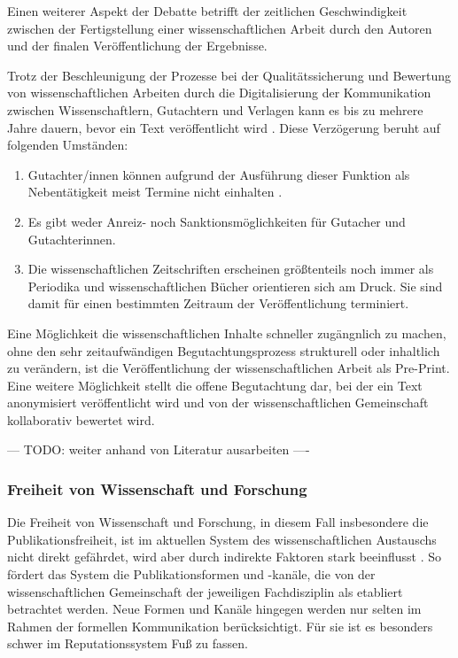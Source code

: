 Einen weiterer Aspekt der Debatte betrifft der zeitlichen Geschwindigkeit zwischen der Fertigstellung einer wissenschaftlichen Arbeit durch den Autoren und der finalen Veröffentlichung der Ergebnisse.

Trotz der Beschleunigung der Prozesse bei der Qualitätssicherung und Bewertung von wissenschaftlichen Arbeiten durch die Digitalisierung der Kommunikation zwischen Wissenschaftlern, Gutachtern und Verlagen kann es bis zu mehrere Jahre dauern, bevor ein Text veröffentlicht wird \cite{suchen}. Diese Verzögerung beruht auf folgenden Umständen:

\begin{enumerate}
\item Gutachter/innen können aufgrund der Ausführung dieser Funktion als Nebentätigkeit meist Termine nicht einhalten \cite{suchen}.
\item Es gibt weder Anreiz- noch Sanktionsmöglichkeiten für Gutacher und Gutachterinnen.
\item Die wissenschaftlichen Zeitschriften erscheinen größtenteils noch immer als Periodika und wissenschaftlichen Bücher orientieren sich am Druck. Sie sind damit für einen bestimmten Zeitraum der Veröffentlichung terminiert.
\end{enumerate}

Eine Möglichkeit die wissenschaftlichen Inhalte schneller zugängnlich zu machen, ohne den sehr zeitaufwändigen Begutachtungsprozess strukturell oder inhaltlich zu verändern, ist die Veröffentlichung der wissenschaftlichen Arbeit als Pre-Print. Eine weitere Möglichkeit stellt die offene Begutachtung dar, bei der ein Text anonymisiert veröffentlicht wird und von der wissenschaftlichen Gemeinschaft kollaborativ bewertet wird.

--- TODO: weiter anhand von Literatur ausarbeiten ----

\subsubsection{Freiheit von Wissenschaft und Forschung}

Die Freiheit von Wissenschaft und Forschung, in diesem Fall insbesondere die Publikationsfreiheit, ist im aktuellen System des wissenschaftlichen Austauschs nicht direkt gefährdet, wird aber durch indirekte Faktoren stark beeinflusst \cite{suchen}. So fördert das System die Publikationsformen und -kanäle, die von der wissenschaftlichen Gemeinschaft der jeweiligen Fachdisziplin als etabliert betrachtet werden. Neue Formen und Kanäle hingegen werden nur selten im Rahmen der formellen Kommunikation berücksichtigt. Für sie ist es besonders schwer im Reputationssystem Fuß zu fassen.


